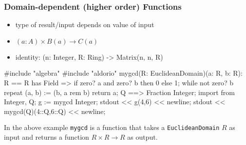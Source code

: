 \begin{frame}[fragile]
\frametitle{Domain-dependent (higher order) Functions}

\begin{itemize}
\item \alert{type} of result/input depends on \alert{value} of input
\item $(a: A) \times B(a) \to C(a)$
\item identity: (n: Integer, R: Ring) -> Matrix(n, n, R)
\end{itemize}
\begin{myverbatim}
#include "algebra"
#include "aldorio"
mygcd(R: EuclideanDomain)(a: R, b: R): R == {
  R has Field => if zero? a and zero? b then 0 else 1;
  while not zero? b repeat { (a, b) := (b, a rem b) }
  return a;
}
Q ==> Fraction Integer;
import from Integer, Q;
g := mygcd Integer;
stdout << g(4,6) << newline;
stdout << mygcd(Q)(4::Q,6::Q) << newline;
\end{myverbatim}
\end{frame}

In the above example \texttt{mygcd} is a function that takes a
\texttt{EuclideanDomain} $R$ as input and returns a function $R\times
R \to R$ as output.








